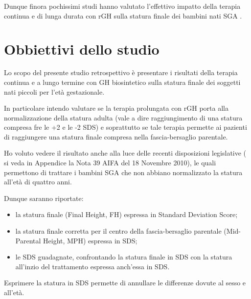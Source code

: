 Dunque finora pochissimi studi hanno valutato l'effettivo impatto della terapia continua e di lunga durata con rGH sulla statura finale dei bambini nati SGA . 


\section{Obbiettivi dello studio}

Lo scopo del presente studio retrospettivo è presentare i risultati della terapia continua e a lungo termine  con GH biosintetico sulla statura finale dei soggetti nati piccoli per l'età gestazionale.

In particolare intendo valutare se la terapia prolungata con rGH porta alla normalizzazione della statura adulta (vale a dire raggiungimento di una statura compresa fre le +2 e le -2 SDS) e soprattutto se tale terapia permette ai pazienti di raggiungere una statura finale compresa nella fascia-bersaglio parentale. 

Ho voluto vedere il risultato anche alla luce delle recenti disposizioni legislative ( si veda in Appendice la Nota 39 AIFA del 18 Novembre 2010), le quali permettono di trattare i bambini SGA che non abbiano normalizzato la statura all'età di quattro anni. 

Dunque saranno riportate:

\begin{itemize}
\item la statura finale (Final Height, FH) espressa in Standard Deviation Score;
\item la statura finale  corretta per il centro della fascia-bersaglio parentale (Mid-Parental Height, MPH) espressa in SDS;
\item le SDS guadagnate, confrontando la statura finale in SDS con la statura all'inzio del trattamento espressa anch'essa in SDS.
\end{itemize}

Esprimere la statura in SDS permette di annullare le differenze dovute al sesso e all'età.

